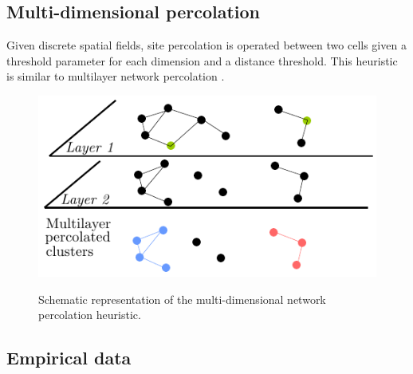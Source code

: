 \documentclass{jimis-en}
\begin{document}
\subsection{Multi-dimensional percolation}


Given discrete spatial fields, site percolation is operated between two cells given a threshold parameter for each dimension and a distance threshold. This heuristic is similar to multilayer network percolation \cite{boccaletti2014structure}.



\begin{figure}[ht] 
  {\includegraphics[width=\linewidth]{figures/principle.pdf}}
  \centering
  \label{fig:method}
  \caption{Schematic representation of the multi-dimensional network percolation heuristic.}
\end{figure}






\subsection{Empirical data}
\end{document}
